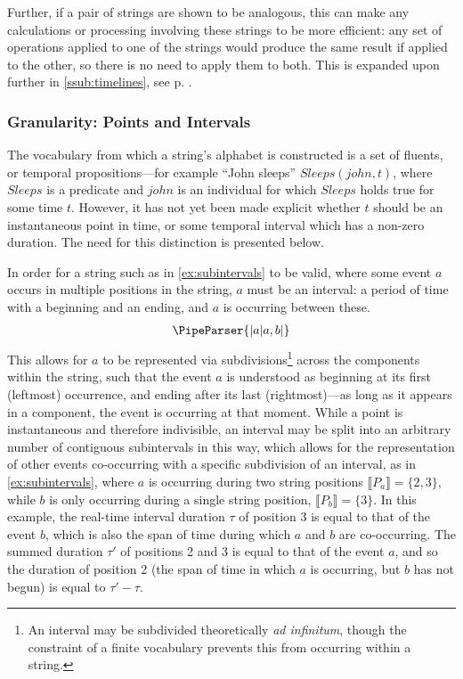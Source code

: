 \documentclass[a4paper,12pt,leqno]{article}
\newcommand{\vph}[1]{\vphantom{#1}}
\newcommand{\ebox}[1]{\fbox{$\vph{'(),}#1$}}
\newcommand{\EventString}[1]{%
	\renewcommand*{\do}[1]{\ebox{##1}}%
	\PipeParser{#1}%
}
\begin{document}
Further, if a pair of strings are shown to be analogous, this can make any calculations or processing involving these strings to be more efficient: any set of operations applied to one of the strings would produce the same result if applied to the other, so there is no need to apply them to both. This is expanded upon further in \cref{ssub:timelines}, see p. \pageref{ex:sp-analogy}.

\subsubsection{Granularity: Points and Intervals}\label{ssub:granularity}
The vocabulary from which a string's alphabet is constructed is a set of fluents, or temporal propositions---for example ``John sleeps'' $Sleeps(john, t)$, where $Sleeps$ is a predicate and $john$ is an individual for which $Sleeps$ holds true for some time $t$. However, it has not yet been made explicit whether $t$ should be an instantaneous point in time, or some temporal interval which has a non-zero duration. The need for this distinction is presented below.

In order for a string such as in \cref{ex:subintervals} to be valid, where some event $a$ occurs in multiple positions in the string, $a$ must be an interval: a period of time with a beginning and an ending, and $a$ is occurring between these.
\begin{align}\label{ex:subintervals}
	\EventString{{}|a|a,b|{}}
\end{align}
This allows for $a$ to be represented via subdivisions\footnote{An interval may be subdivided theoretically \textit{ad infinitum}, though the constraint of a finite vocabulary prevents this from occurring within a string.} across the components within the string, such that the event $a$ is understood as beginning at its first (leftmost) occurrence, and ending after its last (rightmost)---as long as it appears in a component, the event is occurring at that moment. While a point is instantaneous and therefore indivisible, an interval may be split into an arbitrary number of contiguous subintervals in this way, which allows for the representation of other events co-occurring with a specific subdivision of an interval, as in \cref{ex:subintervals}, where $a$ is occurring during two string positions $\llbracket P_a \rrbracket = \{2, 3\}$, while $b$ is only occurring during a single string position, $\llbracket P_b \rrbracket = \{3\}$. In this example, the real-time interval duration $\tau$ of position 3 is equal to that of the event $b$, which is also the span of time during which $a$ and $b$ are co-occurring. The summed duration $\tau'$ of positions 2 and 3 is equal to that of the event $a$, and so the duration of position 2 (the span of time in which $a$ is occurring, but $b$ has not begun) is equal to $\tau' - \tau$.
\end{document}
